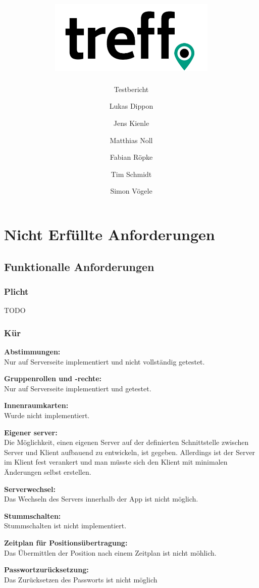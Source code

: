 \documentclass[parskip=full,11pt]{scrartcl}
\title{\includegraphics[width = 80mm]{images/logo_crop.png}}
\subtitle{\huge Testbericht}
\author{Lukas Dippon
        \and Jens Kienle
        \and Matthias Noll
        \and Fabian Röpke
        \and Tim Schmidt
        \and Simon Vögele}
\begin{document}
\maketitle
\thispagestyle{empty} %

\pagebreak
\tableofcontents

\pagebreak
\section{Nicht Erfüllte Anforderungen}
\subsection{Funktionalle Anforderungen}
\subsubsection{Plicht}
TODO
\subsubsection{Kür}
\textbf{Abstimmungen:}\\
Nur auf Serverseite implementiert und nicht vollständig getestet.

\textbf{Gruppenrollen und -rechte:}\\
Nur auf Serverseite implementiert und getestet.

\textbf{Innenraumkarten:}\\
Wurde nicht implementiert.

\textbf{Eigener server:}\\
Die Möglichkeit, einen eigenen Server auf der definierten Schnittstelle zwischen
Server und Klient aufbauend zu entwickeln, ist gegeben. Allerdings ist der
Server im Klient fest verankert und man müsste sich den Klient mit minimalen
Änderungen selbst erstellen.

\textbf{Serverwechsel:}\\
Das Wechseln des Servers innerhalb der App ist nicht möglich.

\textbf{Stummschalten:}\\
Stummschalten ist nicht implementiert.

\textbf{Zeitplan für Positionsübertragung:}\\
Das Übermittlen der Position nach einem Zeitplan ist nicht möhlich.

\textbf{Passwortzurücksetzung:}\\
Das Zurücksetzen des Passworts ist nicht möglich
\end{document}
